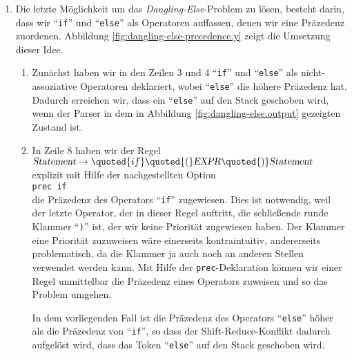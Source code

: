 \begin{enumerate}
\item Die letzte M\"oglichkeit um das \emph{Dangling-Else}-Problem zu l\"osen, besteht darin, dass
      wir ``\texttt{if}'' und ``\texttt{else}'' als Operatoren auffassen, denen wir eine Pr\"azedenz
      zuordenen.  Abbildung \ref{fig:dangling-else-precedence.y} zeigt die Umsetzung dieser Idee.
      \begin{enumerate}
      \item Zun\"achst haben wir in den Zeilen 3 und 4 ``\texttt{if}'' und ``\texttt{else}'' als
            nicht-assoziative Operatoren deklariert, wobei ``\texttt{else}'' die h\"ohere Pr\"azedenz
            hat.  Dadurch erreichen wir, dass ein ``\texttt{else}'' auf den Stack geschoben wird,
            wenn der Parser in dem in Abbildung \ref{fig:dangling-else.output} gezeigten Zustand ist.
      \item In Zeile 8 haben wir der Regel
            \\[0.2cm]
            \hspace*{1.3cm}
            $\textsl{Statement} \rightarrow \quoted{if} \quoted{(} \textsl{EXPR} \quoted{)} \textsl{Statement}$
            \\[0.2cm]      
            explizit mit Hilfe der nachgestellten Option
            \\[0.2cm]
            \hspace*{1.3cm}
            \texttt{prec if}
            \\[0.2cm]
            die Pr\"azedenz des Operators ``\texttt{if}'' zugewiesen.  Dies ist notwendig, weil 
            der letzte Operator, der in dieser Regel auftritt, die schlie{\ss}ende runde Klammer
            ``\texttt{)}'' ist, der wir keine Priorit\"at zugewiesen haben.  Der Klammer eine Priorit\"at
            zuzuweisen w\"are einerseits kontraintuitiv, andererseits problematisch, da die Klammer ja
            auch noch an anderen Stellen verwendet werden kann.  Mit Hilfe der
            \texttt{prec}-Deklaration k\"onnen wir einer Regel unmittelbar die Pr\"azedenz
            eines Operators zuweisen und so das Problem umgehen.

            In dem vorliegenden Fall ist die Pr\"azedenz des Operators ``\texttt{else}''
            h\"oher als die Pr\"azedenz von ``\texttt{if}'', so dass der Shift-Reduce-Konflikt
            dadurch aufgel\"ost wird, dass das Token ``\texttt{else}'' auf den Stack
            geschoben wird.
      \end{enumerate}


\end{enumerate}
